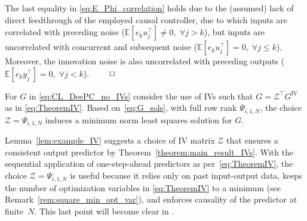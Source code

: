 The last equality in \eqref{eq:E_Phi_correlation} holds due to the (assumed) lack of direct feedthrough of the employed causal controller, due to which inputs are correlated with preceding noise (${\mathbb{E}[e_k u_j^\top]\neq0,\; \forall j>k}$), but inputs are uncorrelated with concurrent and subsequent noise (${\mathbb{E}[e_k u_j^\top]=0,\; \forall j\leq k}$). Moreover, the innovation noise is also uncorrelated with preceding outputs (${\mathbb{E}[e_k y_j^\top]=0,\; \forall j<k}$). $\hfill \qed$
\setcounter{thm}{1}
\begin{rem}
    For $G$ in \eqref{eq:CL_DeePC_no_IVs} consider the use of \ac{IVs} such that $G=\mathcal{Z}^\top G^\mathrm{IV}$ as in \eqref{eq:TheoremIV}. Based on~\eqref{eq:G_sols}, with full row rank $\Psi_{i,1,N}$, the choice $\mathcal{Z}=\Psi_{i,1,N}$ induces a minimum norm least squares solution for $G$.
\end{rem}

Lemma~\ref{lem:example_IV} suggests a choice of \acs{IV} matrix $\mathcal{Z}$ that ensures a consistent output predictor by Theorem~\ref{theorem:main_result_IVs}. With the sequential application of one-step-ahead predictors as per~\eqref{eq:TheoremIV}, the choice $\mathcal{Z}=\Psi_{i,1,N}$ is useful because it relies only on past input-output data, keeps the number of optimization variables in \eqref{eq:TheoremIV} to a minimum (see Remark~\ref{rem:square_min_opt_var}), and enforces causality of the predictor at finite~$N$. This last point will become clear in .

